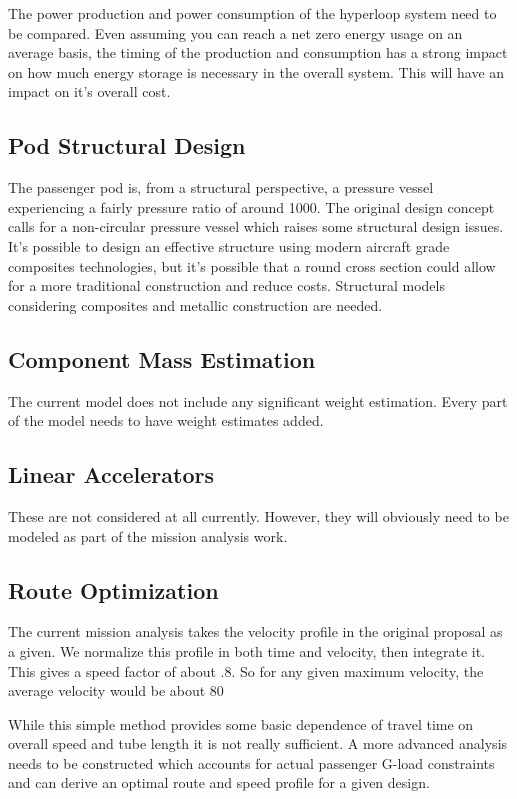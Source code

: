 \documentclass[heading.tex]{subfiles}
\begin{document}
The power production and power consumption of the hyperloop system need to be compared. Even assuming you can reach a net zero energy usage on an average basis, the timing of the production and consumption has a strong impact on how much energy storage is necessary in the overall system. This will have an impact on it's overall cost.

\subsection{Pod Structural Design}
The passenger pod is, from a structural perspective, a pressure vessel experiencing a fairly pressure ratio of around 1000. The original design concept calls for a non-circular pressure vessel which raises some structural design issues. It's possible to design an effective structure using modern aircraft grade composites technologies, but it's possible that a round cross section could allow for a more traditional construction and reduce costs. Structural models considering composites and metallic construction are needed.

\subsection{Component Mass Estimation}
The current model does not include any significant weight estimation. Every part of the model needs to have weight estimates added.

\subsection{Linear Accelerators}
These are not considered at all currently. However, they will obviously need to be modeled as part of the mission analysis work.

\subsection{Route Optimization}
The current mission analysis takes the velocity profile in the original proposal as a given. We normalize this profile in both time and velocity, then integrate it. This gives a speed factor of about .8. So for any given maximum velocity, the average velocity would be about 80%

While this simple method provides some basic dependence of travel time on overall speed and tube length it is not really sufficient. A more advanced analysis needs to be constructed which accounts for actual passenger G-load constraints and can derive an optimal route and speed profile for a given design.
\end{document}
